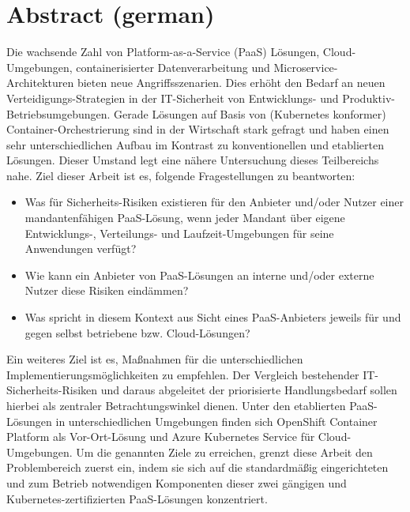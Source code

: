 \chapter*{Abstract (german)}
\thispagestyle{empty}
Die wachsende Zahl von Platform-as-a-Service (PaaS) Lösungen, Cloud-Umgebungen, containerisierter Datenverarbeitung und Microservice-Architekturen bieten neue Angriffsszenarien.
Dies erhöht den Bedarf an neuen Verteidigungs-Strategien in der IT-Sicherheit von Entwicklungs- und Produktiv-Betriebsumgebungen.
Gerade Lösungen auf Basis von (Kubernetes konformer) Container-Orchestrierung sind in der Wirtschaft stark gefragt und haben einen sehr unterschiedlichen Aufbau im Kontrast zu konventionellen und etablierten Lösungen.
Dieser Umstand legt eine nähere Untersuchung dieses Teilbereichs nahe.
Ziel dieser Arbeit ist es, folgende Fragestellungen zu beantworten:

\begin{itemize}

\item Was für Sicherheits-Risiken existieren für den Anbieter und/oder Nutzer einer mandantenfähigen PaaS-Lösung, wenn jeder Mandant über eigene Entwicklungs-, Verteilungs- und Laufzeit-Umgebungen für seine Anwendungen verfügt?

\item Wie kann ein Anbieter von PaaS-Lösungen an interne und/oder externe Nutzer diese Risiken eindämmen?

\item Was spricht in diesem Kontext aus Sicht eines PaaS-Anbieters jeweils für und gegen selbst betriebene bzw. Cloud-Lösungen?

\end{itemize}

Ein weiteres Ziel ist es, Maßnahmen für die unterschiedlichen Implementierungsmöglichkeiten zu empfehlen.
Der Vergleich bestehender IT-Sicherheits-Risiken und daraus abgeleitet der priorisierte Handlungsbedarf sollen hierbei als zentraler Betrachtungswinkel dienen.
Unter den etablierten PaaS-Lösungen in unterschiedlichen Umgebungen finden sich OpenShift Container Platform als Vor-Ort-Lösung und Azure Kubernetes Service für Cloud-Umgebungen.
Um die genannten Ziele zu erreichen, grenzt diese Arbeit den Problembereich zuerst ein, indem sie sich auf die standardmäßig eingerichteten und zum Betrieb notwendigen Komponenten dieser zwei gängigen und Kubernetes-zertifizierten PaaS-Lösungen konzentriert.

